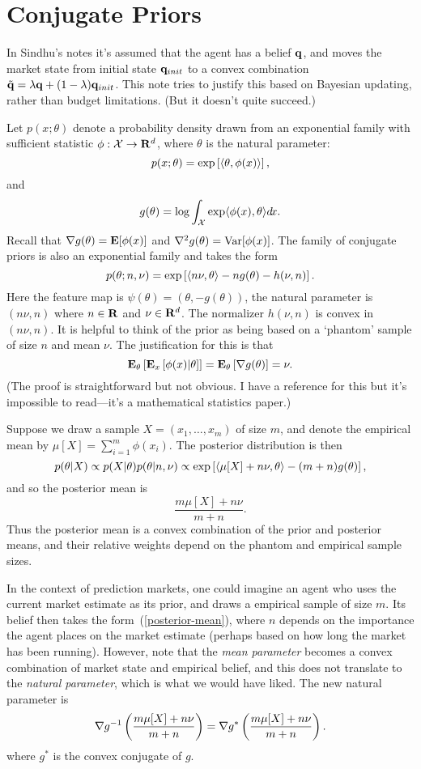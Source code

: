 
\section{Conjugate Priors}

In Sindhu's notes it's assumed that the agent has a belief $\mathbf{q}$, and moves the market state from initial state $\mathbf{q}_{init}$ to a convex combination $\tilde{\mathbf{q}} = \lambda \mathbf{q} + (1-\lambda)\mathbf{q}_{init}$. This note tries to justify this based on Bayesian updating, rather than budget limitations. (But it doesn't quite succeed.)

\medskip\noindent
Let $p(x;\theta)$ denote a probability density drawn from an exponential family with sufficient statistic $\phi : \mathcal{X} \rightarrow \mathbf{R}^d$, where $\theta$ is the natural parameter:
$$
p(x;\theta) = \exp \left[ \langle \theta, \phi(x) \rangle \right],
$$
and
$$
g(\theta) = \log \int_{\mathcal{X}} \exp\langle\phi(x),\theta\rangle d\!x.
$$
Recall that $\nabla g(\theta) = \mathbf{E}[\phi(x)]$ and $\nabla^2 g(\theta) = \mathrm{Var}[\phi(x)]$. The family of conjugate priors is also an exponential family and takes the form
$$
p(\theta; n,\nu) = \exp\left[ \langle n\nu,\theta \rangle - ng(\theta) - h(\nu,n) \right].
$$
Here the feature map is $\psi(\theta) = (\theta, -g(\theta))$, the natural parameter is $(n\nu, n)$ where $n \in \mathbf{R}$ and $\nu \in \mathbf{R}^d$. The normalizer $h(\nu, n)$ is convex in $(n\nu,n)$. It is helpful to think of the prior as being based on a `phantom' sample of size $n$ and mean $\nu$. The justification for this is that
$$
\mathbf{E}_{\theta} \left[ \mathbf{E}_x \left[ \phi(x) | \theta \right]\right] 
= \mathbf{E}_{\theta} \left[\nabla g(\theta)\right]
= \nu.
$$
(The proof is straightforward but not obvious. I have a reference for this but it's impossible to read---it's a mathematical statistics paper.)

Suppose we draw a sample $X = (x_1,\ldots,x_m)$ of size $m$, and denote the empirical mean by $\mu[X] = \sum_{i=1}^m \phi(x_i)$. The posterior distribution is then
$$
p(\theta|X) \propto p(X|\theta)p(\theta|n,\nu) \propto \exp\left[ \langle\mu[X]+n\nu,\theta\rangle - (m+n)g(\theta) \right],
$$
and so the posterior mean is 
\begin{equation} \label{posterior-mean}
\frac{m\mu[X] + n\nu}{m+n}.
\end{equation}
Thus the posterior mean is a convex combination of the prior and posterior means, and their relative weights depend on the phantom and empirical sample sizes.

In the context of prediction markets, one could imagine an agent who uses the current market estimate as its prior, and draws a empirical sample of size $m$. Its belief then takes the form~(\ref{posterior-mean}), where $n$ depends on the importance the agent places on the market estimate (perhaps based on how long the market has been running). However, note that the \emph{mean parameter} becomes a convex combination of market state and empirical belief, and this does not translate to the \emph{natural parameter}, which is what we would have liked. The new natural parameter is
$$
\nabla g^{-1} \left(\frac{m\mu[X] + n\nu}{m+n}\right) = \nabla g^* \left(\frac{m\mu[X] + n\nu}{m+n}\right).
$$
where $g^*$ is the convex conjugate of $g$.

